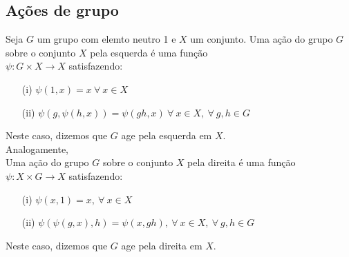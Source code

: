\subsection{Ações de grupo}
\label{ações-de-grupo-def}


\begin{defi}
	Seja $G$ um grupo com elemto neutro 1 e $X$ um conjunto. Uma ação do grupo $G$ sobre o conjunto $X$ pela esquerda é uma função\\
 $\psi: G\times X \longrightarrow X$ satisfazendo:
 
 \begin{itemize}
     \item[(i)] $\psi(1,x) = x \  \forall\  x \in X$
     \item[(ii)] $\psi(g,\psi(h,x)) = \psi(gh,x) \ \forall\ x \in X,\ \forall\ g,h \in G$
 \end{itemize}
 Neste caso, dizemos que $G$ age pela esquerda em $X$.\\
 

\noindent Analogamente,\\
 Uma ação do grupo $G$ sobre o conjunto $X$ pela direita é uma função\\
 $\psi: X\times G \longrightarrow X$ satisfazendo:
 
 \begin{itemize}
     \item[(i)] $\psi(x,1) = x ,\  \forall\  x \in X$
     \item[(ii)] $\psi(\psi(g,x), h) = \psi(x,gh), \ \forall\ x \in X,\ \forall\ g,h \in G$
 \end{itemize}
 Neste caso, dizemos que $G$ age pela direita em $X$.

\end{defi}

